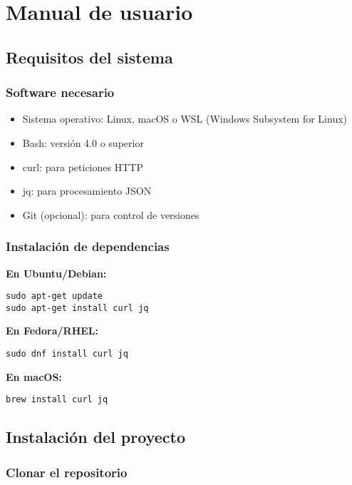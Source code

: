 \chapter{Manual de usuario}

\section{Requisitos del sistema}

\subsection{Software necesario}

\begin{itemize}
  \item Sistema operativo: Linux, macOS o WSL (Windows Subsystem for Linux)
  \item Bash: versión 4.0 o superior
  \item curl: para peticiones HTTP
  \item jq: para procesamiento JSON
  \item Git (opcional): para control de versiones
\end{itemize}

\subsection{Instalación de dependencias}

\textbf{En Ubuntu/Debian:}
\begin{lstlisting}[style=bash]
sudo apt-get update
sudo apt-get install curl jq
\end{lstlisting}

\textbf{En Fedora/RHEL:}
\begin{lstlisting}[style=bash]
sudo dnf install curl jq
\end{lstlisting}

\textbf{En macOS:}
\begin{lstlisting}[style=bash]
brew install curl jq
\end{lstlisting}

\section{Instalación del proyecto}

\subsection{Clonar el repositorio}

